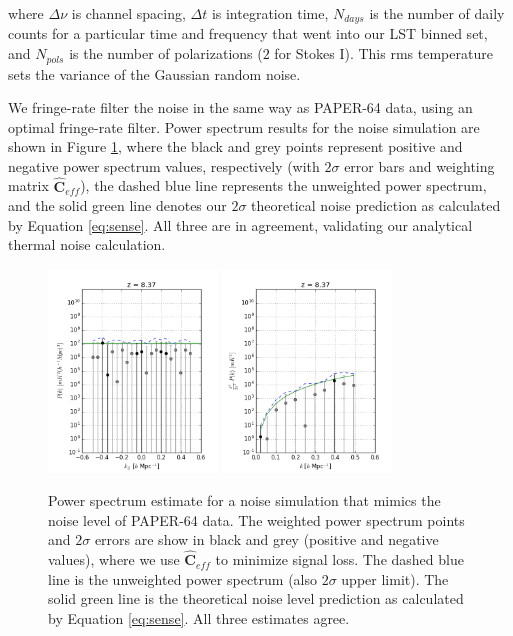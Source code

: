 \documentclass[preprint2,numberedappendix,tighten]{aastex6}  %
\begin{document}
\noindent where $\Delta\nu$ is channel spacing, $\Delta t$ is integration time, $N_{days}$ is the number of daily counts for a particular time and frequency that went into our LST binned set, and $N_{pols}$ is the number of polarizations ($2$ for Stokes I). This rms temperature sets the variance of the Gaussian random noise.

We fringe-rate filter the noise in the same way as PAPER-64 data, using an optimal fringe-rate filter. Power spectrum results for the noise simulation are shown in Figure \ref{fig:ps_noise}, where the black and grey points represent positive and negative power spectrum values, respectively (with $2\sigma$ error bars and weighting matrix $\hat{\textbf{C}}_{eff}$), the dashed blue line represents the unweighted power spectrum, and the solid green line denotes our $2\sigma$ theoretical noise prediction as calculated by Equation \eqref{eq:sense}. All three are in agreement, validating our analytical thermal noise calculation. 

\begin{figure}
	\centering
	\includegraphics[width=0.4\textwidth]{plots/ps1_noise_reg.png}
	\includegraphics[width=0.4\textwidth]{plots/ps2_noise_reg.png}
	\caption{Power spectrum estimate for a noise simulation that mimics the noise level of PAPER-64 data. The weighted power spectrum points and $2\sigma$ errors are show in black and grey (positive and negative values), where we use $\hat{\textbf{C}}_{eff}$ to minimize signal loss. The dashed blue line is the unweighted power spectrum (also $2\sigma$ upper limit). The solid green line is the theoretical noise level prediction as calculated by Equation \eqref{eq:sense}. All three estimates agree.}
	\label{fig:ps_noise}
\end{figure}
\end{document}
